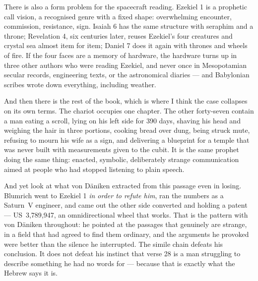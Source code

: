 There is also a form problem for the spacecraft reading. Ezekiel 1 is a prophetic call vision, a
recognised genre with a fixed shape: overwhelming encounter, commission, resistance, sign. Isaiah 6
has the same structure with seraphim and a throne; Revelation 4, six centuries later, reuses
Ezekiel's four creatures and crystal sea almost item for item; Daniel 7 does it again with thrones
and wheels of fire. If the four faces are a memory of hardware, the hardware turns up in three
other authors who were reading Ezekiel, and never once in Mesopotamian secular records, engineering
texts, or the astronomical diaries --- and Babylonian scribes wrote down everything, including
weather.

And then there is the rest of the book, which is where I think the case collapses on its own
terms. The chariot occupies one chapter. The other forty-seven contain a man eating a scroll,
lying on his left side for 390 days, shaving his head and weighing the hair in three portions,
cooking bread over dung, being struck mute, refusing to mourn his wife as a sign, and delivering a
blueprint for a temple that was never built with measurements given to the cubit.
 It is the same prophet doing the same
thing: enacted, symbolic, deliberately strange communication aimed at people who had stopped
listening to plain speech.

And yet look at what von Däniken extracted from this passage even in losing. Blumrich went to
Ezekiel 1 \emph{in order to refute him}, ran the numbers as a Saturn~V engineer, and came out the
other side converted and holding a patent --- US~3,789,947, an omnidirectional wheel that works.
 That is the pattern with von Däniken
throughout: he pointed at the passages that genuinely are strange, in a field that had agreed to
find them ordinary, and the arguments he provoked were better than the silence he interrupted. The
simile chain defeats his conclusion. It does not defeat his instinct that verse 28 is a man
struggling to describe something he had no words for --- because that is exactly what the Hebrew
says it is.


